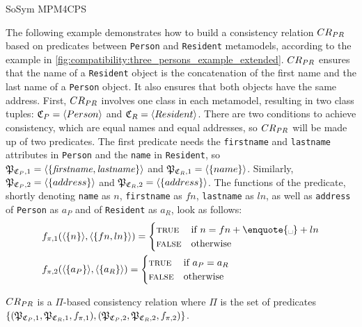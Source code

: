 \begin{copiedFrom}{SoSym MPM4CPS}
\begin{example}
The following example demonstrates how to build a consistency relation $\consistencyrelation{CR}{PR}$ based on predicates between \texttt{Person} and \texttt{Resident} metamodels, according to the example in \autoref{fig:compatibility:three_persons_example_extended}. $\consistencyrelation{CR}{PR}$ ensures that the name of a \texttt{Resident} object is the concatenation of the first name and the last name of a \texttt{Person} object. It also ensures that both objects have the same address. First, $\consistencyrelation{CR}{PR}$ involves one class in
each metamodel, resulting in two class tuples: $\classtuple{C}{P} = \tupled{Person}$ and $\classtuple{C}{R} = \tupled{Resident}$. There are two conditions to achieve consistency, which are equal names and equal addresses, so $\consistencyrelation{CR}{PR}$ will be made up of two predicates. The first predicate needs the \texttt{firstname} and \texttt{lastname} attributes in \texttt{Person} and the \texttt{name} in \texttt{Resident}, so $\propertysettuple{P}{\classtuple{C}{P}, 1} = \tupled{\{\mathvariable{firstname}, \mathvariable{lastname}\}}$ and $\propertysettuple{P}{\classtuple{C}{R}, 1} = \tupled{\{name\}}$. Similarly, $\propertysettuple{P}{\classtuple{C}{P}, 2} = \tupled{\{address\}}$ and $\propertysettuple{P}{\classtuple{C}{R}, 2} = \tupled{\{address\}}$.
The functions of the predicate, shortly denoting \texttt{name} as $n$, \texttt{firstname} as $fn$, \texttt{lastname} as $ln$, as well as \texttt{address} of \texttt{Person} as $a_P$ and of \texttt{Resident} as $a_R$, look as follows:
\begin{align*}
   &
   f_{\pi, 1}(\tupled{\{n\}}, \tupled{\{fn, ln\}}) = \begin{cases} 
      \textsc{true} & \text{if}\ n = fn + \textnormal{\enquote{\textvisiblespace}} + ln \\
      \textsc{false} & \text{otherwise}
   \end{cases} \\
   &
   f_{\pi, 2}(\tupled{\{a_P\}}, \tupled{\{a_R\}}) = \begin{cases} 
      \textsc{true} & \text{if}\ a_P = a_R \\
      \textsc{false} & \text{otherwise}
   \end{cases}
\end{align*}

$\consistencyrelation{CR}{PR}$ is a $\Pi$-based consistency relation where $\Pi$ is the set of predicates $\{(\propertysettuple{P}{\classtuple{C}{P}, 1}, \propertysettuple{P}{\classtuple{C}{R}, 1}, f_{\pi, 1}), (\propertysettuple{P}{\classtuple{C}{P}, 2}, \propertysettuple{P}{\classtuple{C}{R}, 2}, f_{\pi, 2})\}$.
\end{example}


\end{copiedFrom}
